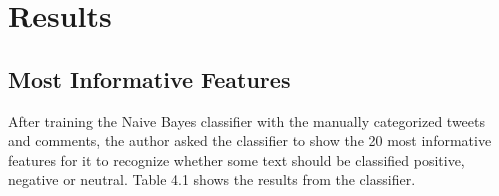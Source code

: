 \chapter[Results]{Results}
\label{chap:results}


\section{Most Informative Features} \label{sec:MostInformativeFeatures}

After training the Naive Bayes classifier with the manually categorized tweets and comments, the author
asked the classifier to show the 20 most informative features for it to recognize whether some text
should be classified positive, negative or neutral. Table 4.1 shows the results from the classifier.  \\

